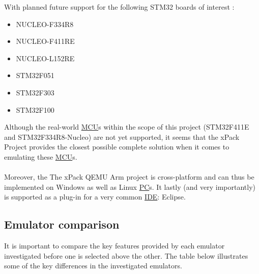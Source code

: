 With planned future support for the following STM32 boards of interest \cite{xPack}:

\begin{itemize}
\item NUCLEO-F334R8
\item NUCLEO-F411RE
\item NUCLEO-L152RE
\item STM32F051
\item STM32F303
\item STM32F100
\end{itemize}

Although the real-world \hyperref[listAbr]{MCU}s within the scope of this project (STM32F411E and STM32F334R8-Nucleo) are not yet supported, it seems that the xPack Project provides the closest possible complete solution when it comes to emulating these \hyperref[listAbr]{MCU}s.
\\\\
Moreover, the The xPack QEMU Arm project is cross-platform and can thus be implemented on Windows as well as Linux \hyperref[listAbr]{PC}s. It lastly (and very importantly) is supported as a plug-in for a very common \hyperref[listAbr]{IDE}: Eclipse.

\newpage\cleardoublepage
\subsection{Emulator comparison}
\label{emulComp}
It is important to compare the key features provided by each emulator investigated before one is selected above the other. The table below illustrates some of the key differences in the investigated emulators.

